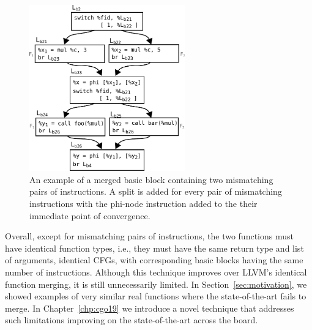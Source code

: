 \begin{figure}[h]
  \centering
  \includegraphics[width=0.6\textwidth]{src/relatedwork/figs/soa-example-2.pdf}
  \caption{An example of a merged basic block containing two mismatching pairs of instructions. A split is added for every pair of mismatching instructions with the phi-node instruction added to the their immediate point of convergence.}
  \label{fig:soa-example-2}
\end{figure}

Overall, except for mismatching pairs of instructions, the two functions must have identical function types, i.e., they must have the same return type and list of arguments, identical CFGs, with corresponding basic blocks having the same number of instructions.
Although this technique improves over LLVM's identical function merging, it is
still unnecessarily limited.
In Section~\ref{sec:motivation}, we showed examples of very similar real functions where the state-of-the-art fails to merge.
In Chapter~\ref{chp:cgo19} we introduce a novel technique that addresses such limitations improving on the state-of-the-art across the board.


